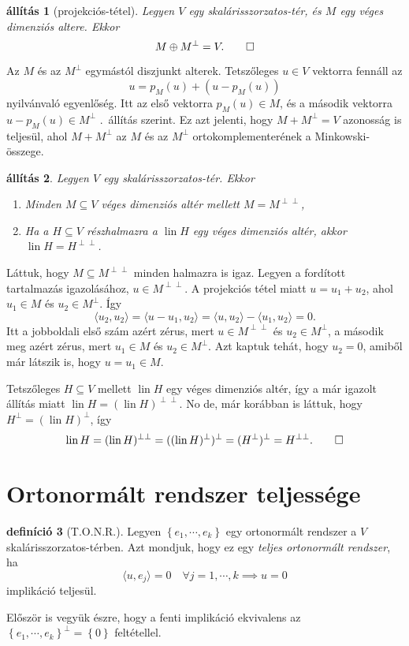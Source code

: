 \documentclass[9pt, a4paper, showtrims]{memoir}
\makeatletter
\renewenvironment{proof}[1][\proofname]
    {\par\pushQED{\qed}%
    \normalfont \topsep6\p@\@plus6\p@\relax
    \trivlist
    \item[\hskip\labelsep
        \itshape
    #1\@addpunct{:}]\ignorespaces}
    {\popQED\endtrivlist\@endpefalse}
\theoremstyle{plain}
\newtheorem{proposition}{állítás}[chapter]
\theoremstyle{remark}
\theoremstyle{definition}
\newtheorem{definition}[proposition]{definíció}
\DeclareMathOperator{\lin}{lin}
\newcommand{\ip}[2]{\langle#1,#2\rangle}
\makeatother
\begin{document}
\begin{proposition}[projekciós-tétel]\label{pr:projekcios}
	Legyen $V$ egy skalárisszorzatos-tér, és $M$ egy véges dimenziós altere.
	Ekkor
	\[
		M\oplus M^\perp=V.
		\qedhere
	\]
\end{proposition}
\begin{proof}
	Az $M$ és az $M^\perp$ egymástól diszjunkt alterek.
	Tetszőleges $u\in V$ vektorra fennáll az
	\[
		u=p_M\left( u \right)+\left( u-p_M\left( u \right) \right)
	\]
	nyilvánvaló egyenlőség.
	Itt az első vektorra $p_M\left( u \right)\in M$, és a második vektorra $u-p_M\left( u \right)\in M^\perp$
	.~állítás szerint.
	Ez azt jelenti, hogy $M+M^\perp=V$ azonosság is teljesül,
	ahol $M+M^\perp$ az $M$ és az $M^\perp$ ortokomplementerének a Minkowski-összege.
\end{proof}
\begin{proposition}
	Legyen $V$ egy skalárisszorzatos-tér.
	Ekkor
	\begin{enumerate}
		\item Minden $M\subseteq V$ véges dimenziós altér mellett $M=M^{\perp\perp}$,
		\item Ha a $H\subseteq V$ részhalmazra a $\lin H$ egy véges dimenziós altér, 
            akkor $\lin H=H^{\perp\perp}$.
		      \qedhere
	\end{enumerate}
\end{proposition}
\begin{proof}
	Láttuk, hogy $M\subseteq M^{\perp\perp}$ minden halmazra is igaz.
	Legyen a fordított tartalmazás igazolásához,
	$u\in M^{\perp\perp}$.
	A projekciós tétel miatt $u=u_1+u_2$,
	ahol $u_1\in M$ és $u_2\in M^{\perp}$.
	Így
	\[
		\ip{u_2}{u_2}
		=
		\ip{u-u_1}{u_2}
		=
		\ip{u}{u_2}-\ip{u_1}{u_2}=0.
	\]
	Itt a jobboldali első szám azért zérus,
	mert $u\in M^{\perp\perp}$ és $u_2\in M^\perp$,
	a második meg azért zérus,
	mert $u_1\in M$ és $u_2\in M^\perp$.
	Azt kaptuk tehát, hogy $u_2=0$, amiből már látszik is, hogy $u=u_1\in M$.

	Tetszőleges $H\subseteq V$ mellett $\lin H$ egy véges dimenziós altér,
	így a már igazolt állítás miatt
	$\lin H=(\lin H)^{\perp\perp}$.
	No de, már korábban is láttuk, hogy
	$H^{\perp}=(\lin H)^\perp$, így
	\[
		\lin H
		=
		(\lin H)^{\perp\perp}
		=
		((\lin H)^\perp)^\perp=(H^{\perp})^\perp=H^{\perp\perp}.
		\qedhere
	\]
\end{proof}
\section{Ortonormált rendszer teljessége}
\begin{definition}[T.O.N.R.]
	Legyen $\left\{ e_1,\cdots,e_k \right\}$ egy ortonormált rendszer a $V$ skalárisszorzatos-térben.
	Azt mondjuk, hogy ez egy \emph{teljes ortonormált rendszer}, ha
	\[
		\ip{u}{e_j}=0\quad\forall j=1,\cdots,k \implies u=0
	\]
	implikáció teljesül.
\end{definition}
Először is vegyük észre, hogy a fenti implikáció ekvivalens az
$\left\{ e_1,\cdots,e_k \right\}^\perp =\left\{ 0 \right\}$
feltétellel.
\end{document}
